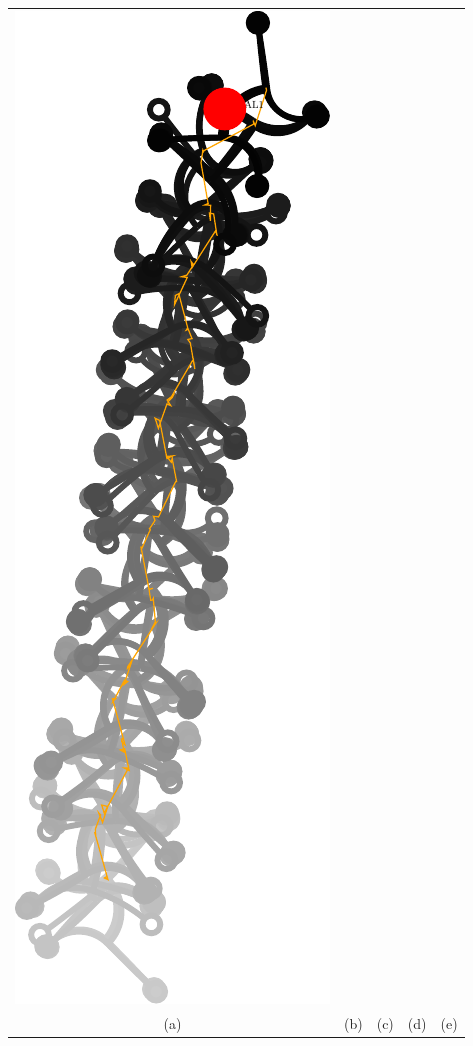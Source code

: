 \documentclass[10pt,a4paper]{article}
\begin{document}
\begin{tabular}{ccccc}
\includegraphics[scale=.5]{pics/pathplanner_with_noise/example_straight_05/gait.pdf}
\\
(a) & (b) & (c) & (d) & (e) 
\\
\end{tabular}
\end{document}
